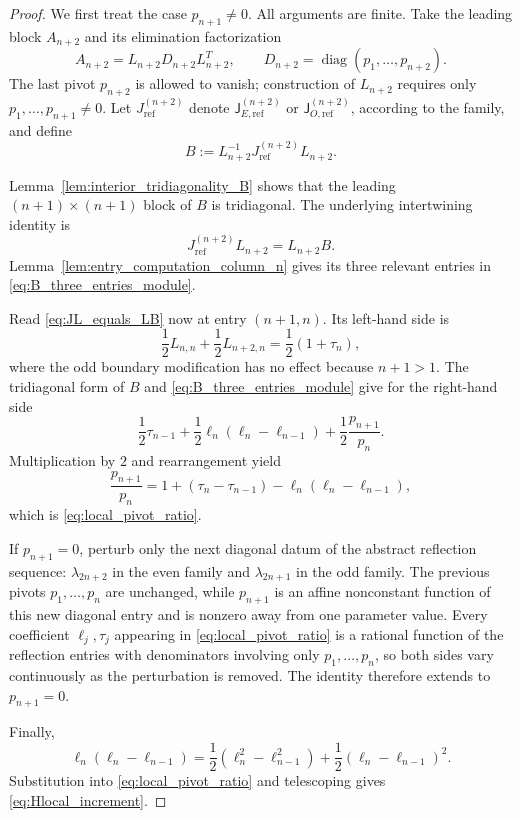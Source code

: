 \documentclass[preprint,12pt]{elsarticle}
\numberwithin{equation}{section}
\theoremstyle{plain}
\theoremstyle{definition}
\theoremstyle{remark}
\newcommand{\J}{\mathsf J}
\newcommand{\diag}{\operatorname{diag}}
\begin{document}
\begin{proof}
We first treat the case \(p_{n+1}\ne0\).  All arguments are finite.  Take the leading
block \(A_{n+2}\) and its elimination factorization
\[
A_{n+2}=L_{n+2}D_{n+2}L_{n+2}^T,
\qquad
D_{n+2}=\diag(p_1,\ldots,p_{n+2}).
\]
The last pivot \(p_{n+2}\) is allowed to vanish; construction of \(L_{n+2}\) requires only
\(p_1,\ldots,p_{n+1}\ne0\).  Let \(J_{\mathrm{ref}}^{(n+2)}\) denote
\(\J_{E,\mathrm{ref}}^{(n+2)}\) or \(\J_{O,\mathrm{ref}}^{(n+2)}\), according to the
family, and define
\[
B:=L_{n+2}^{-1}J_{\mathrm{ref}}^{(n+2)}L_{n+2}.
\]

Lemma~\ref{lem:interior_tridiagonality_B} shows that the leading
\((n+1)\times(n+1)\) block of \(B\) is tridiagonal.  The underlying intertwining identity is
\begin{equation}
J_{\mathrm{ref}}^{(n+2)}L_{n+2}=L_{n+2}B.
\label{eq:JL_equals_LB}
\end{equation}
Lemma~\ref{lem:entry_computation_column_n} gives its three relevant entries in
\eqref{eq:B_three_entries_module}.

Read \eqref{eq:JL_equals_LB} now at entry \((n+1,n)\).  Its left-hand side is
\[
\frac12L_{n,n}+\frac12L_{n+2,n}
=\frac12(1+\tau_n),
\]
where the odd boundary modification has no effect because \(n+1>1\).  The tridiagonal
form of \(B\) and \eqref{eq:B_three_entries_module} give for the
right-hand side
\[
\frac12\tau_{n-1}
+\frac12\ell_n(\ell_n-\ell_{n-1})
+\frac12\frac{p_{n+1}}{p_n}.
\]
Multiplication by \(2\) and rearrangement yield
\[
\frac{p_{n+1}}{p_n}
=
1+(\tau_n-\tau_{n-1})
-\ell_n(\ell_n-\ell_{n-1}),
\]
which is \eqref{eq:local_pivot_ratio}.

If \(p_{n+1}=0\), perturb only the next diagonal datum of the abstract reflection sequence:
\(\lambda_{2n+2}\) in the even family and \(\lambda_{2n+1}\) in the odd family.  The
previous pivots \(p_1,\ldots,p_n\) are unchanged, while \(p_{n+1}\) is an affine
nonconstant function of this new diagonal entry and is nonzero away from one parameter
value.  Every coefficient \(\ell_j,\tau_j\) appearing in
\eqref{eq:local_pivot_ratio} is a rational function of the reflection entries with
denominators involving only \(p_1,\ldots,p_n\), so both sides vary continuously as the
perturbation is removed.  The identity therefore extends to \(p_{n+1}=0\).

Finally,
\[
\ell_n(\ell_n-\ell_{n-1})
=
\frac12(\ell_n^2-\ell_{n-1}^2)
+\frac12(\ell_n-\ell_{n-1})^2.
\]
Substitution into \eqref{eq:local_pivot_ratio} and telescoping gives
\eqref{eq:Hlocal_increment}.
\end{proof}
\end{document}
